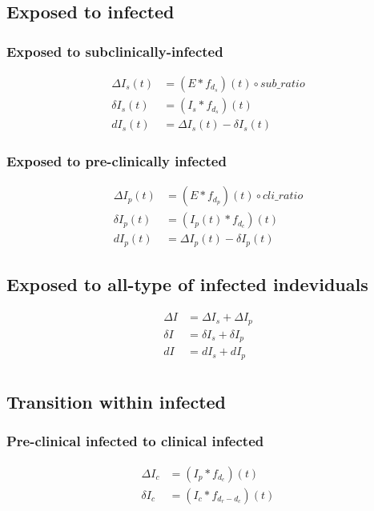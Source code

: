 \documentclass[12pt]{article}
\newcommand{\vect}[1]{\left( #1 \right)}
\begin{document}
\subsection*{Exposed to infected}
\subsubsection*{Exposed to subclinically-infected}
\begin{align*}
    \Delta I_s(t) &= \vect{E * f_{d_s}  }(t) \circ  sub\_ratio \\
    \delta I_s(t) &= \vect{I_s * f_{d_{s}}} (t) \\
    d I_s(t) &=  \Delta I_s(t)  -  \delta I_s (t)
\end{align*}

\subsubsection*{Exposed to pre-clinically infected}
\begin{align*}
    \Delta I_p(t) &= \vect{E * f_{d_p} }(t) \circ  cli\_ratio \\
    \delta I_p(t) &= \vect{I_p(t) * f_{d_{c}}} (t) \\
    d I_p(t) &=  \Delta I_p (t)  -  \delta I_p (t)
\end{align*}

\subsection*{Exposed to all-type of infected indeviduals}
\begin{align*}
    \Delta I &= \Delta I_s + \Delta I_p\\
    \delta I &= \delta I_s + \delta I_p\\
    d I &= d I_s + d I_p\\
\end{align*}

\subsection*{Transition within infected}
\subsubsection*{Pre-clinical infected to clinical infected}
\begin{align*}
    \Delta I_c &= \vect{I_p * f_{d_c}} (t)\\
    \delta I_c &= \vect{I_c * f_{d_r - d_c}} (t)\\
\end{align*}
\end{document}
